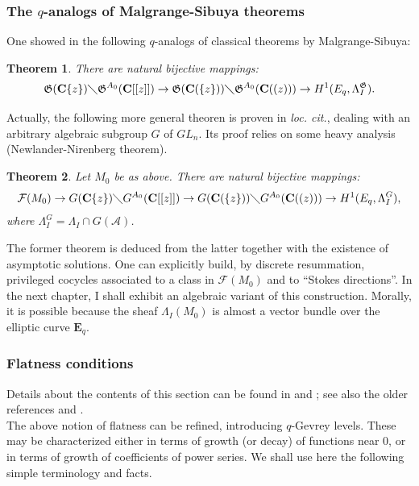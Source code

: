 \documentclass[english]{smfart}
\newtheorem{thm}{Theorem}[section]
\numberwithin{equation}{thm}
\def\C{{\mathbf C}}
\def\F{{\mathcal{F}}}
\def\A{{\mathcal{A}}}
\def\Eq{{\mathbf{E}_{q}}}
\def\G{{\mathfrak{G}}}
\def\Ra{{\C\{z\}}}
\def\Ka{{\C(\{z\})}}
\def\Rf{{\C[[z]]}}
\def\Kf{{\C((z))}}
\def\La{\Lambda}
\begin{document}
\subsubsection*{The $q$-analogs of Malgrange-Sibuya theorems}

One showed in \cite{RSZ} the following $q$-analogs of classical 
theorems by Malgrange-Sibuya:

\begin{thm}
There are natural bijective mappings:
$$
\G(\Ra) \diagdown \G^{A_{0}}(\Rf) \rightarrow
\G(\Ka) \diagdown \G^{A_{0}}(\Kf) \rightarrow
H^{1}(E_{q},\La_{I}^{\G}).
$$
\end{thm}

Actually, the following more general theoren is proven in 
\emph{loc. cit.}, dealing with an arbitrary algebraic subgroup 
$G$ of $GL_{n}$. Its proof relies on some heavy analysis 
(Newlander-Nirenberg theorem). 

\begin{thm}
Let $M_{0}$ be as above. There are natural bijective mappings:
$$
\F(M_{0}) \rightarrow
G(\Ra) \diagdown G^{A_{0}}(\Rf) \rightarrow
G(\Ka) \diagdown G^{A_{0}}(\Kf) \rightarrow
H^{1}(E_{q},\La_{I}^{G}),
$$
where $\La_{I}^{G} = \La_{I} \cap G(\A)$.
\end{thm}

The former theorem is deduced from the latter together with the existence 
of asymptotic solutions. One can explicitly build, by discrete 
resummation, privileged cocycles associated to a class in $\F(M_{0})$ 
and to ``Stokes directions''. In the next chapter, I shall exhibit
an algebraic variant of this construction. Morally, it is possible
because the sheaf $\La_{I}(M_{0})$ is almost a vector bundle over
the elliptic curve $\Eq$.

\subsubsection*{Flatness conditions}

Details about the contents of this section can be found 
in \cite{RZ} and \cite{RSZ}; see also the older references 
\cite{RamisGrowth} and \cite{RamisJPRTraum}. \\

The above notion of flatness can be refined, introducing 
$q$-Gevrey levels. These may be characterized either in
terms of growth (or decay) of functions near $0$, or in terms of growth
of coefficients of power series. We shall use here the following
simple terminology and facts. \\
\end{document}
